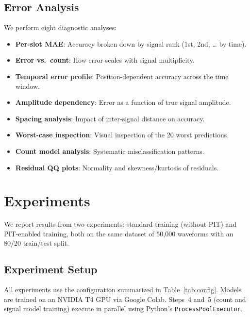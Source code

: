 \documentclass[11pt,twocolumn]{article}
\begin{document}
\subsection{Error Analysis}

We perform eight diagnostic analyses:
\begin{itemize}
    \item \textbf{Per-slot MAE}: Accuracy broken down by signal rank (1st, 2nd, \ldots{} by time).
    \item \textbf{Error vs.\ count}: How error scales with signal multiplicity.
    \item \textbf{Temporal error profile}: Position-dependent accuracy across the time window.
    \item \textbf{Amplitude dependency}: Error as a function of true signal amplitude.
    \item \textbf{Spacing analysis}: Impact of inter-signal distance on accuracy.
    \item \textbf{Worst-case inspection}: Visual inspection of the 20 worst predictions.
    \item \textbf{Count model analysis}: Systematic misclassification patterns.
    \item \textbf{Residual QQ plots}: Normality and skewness/kurtosis of residuals.
\end{itemize}

\section{Experiments}
\label{sec:experiments}

We report results from two experiments: standard training (without PIT) and PIT-enabled training, both on the same dataset of 50{,}000 waveforms with an 80/20 train/test split.

\subsection{Experiment Setup}

All experiments use the configuration summarized in Table~\ref{tab:config}.
Models are trained on an NVIDIA T4 GPU via Google Colab.
Steps~4 and~5 (count and signal model training) execute in parallel using Python's \texttt{ProcessPoolExecutor}.
\end{document}
